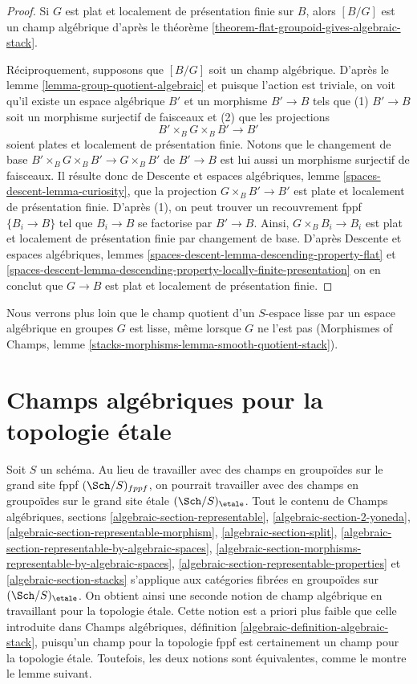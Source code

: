 \begin{proof}
Si $G$ est plat et localement de présentation finie sur $B$, alors
$[B/G]$ est un champ algébrique d'après le
théorème \ref{theorem-flat-groupoid-gives-algebraic-stack}.

\medskip\noindent
Réciproquement, supposons que $[B/G]$ soit un champ algébrique. D'après le
lemme \ref{lemma-group-quotient-algebraic}
et puisque l'action est triviale, on voit
qu'il existe un espace algébrique $B'$ et un morphisme
$B' \to B$ tels que (1) $B' \to B$ soit un morphisme surjectif
de faisceaux et (2) que les projections
$$
B' \times_B G \times_B B' \to B'
$$
soient plates et localement de présentation finie. Notons que le changement de base
$B' \times_B G \times_B B' \to G \times_B B'$ de $B' \to B$
est lui aussi un morphisme surjectif de faisceaux. Il résulte donc de
Descente et espaces algébriques, lemme \ref{spaces-descent-lemma-curiosity},
que la projection $G \times_B B' \to B'$ est plate et localement
de présentation finie. D'après (1), on peut trouver un recouvrement fppf
$\{B_i \to B\}$ tel que $B_i \to B$ se factorise par $B' \to B$.
Ainsi, $G \times_B B_i \to B_i$ est plat et localement de présentation finie
par changement de base. D'après
Descente et espaces algébriques, lemmes
\ref{spaces-descent-lemma-descending-property-flat} et
\ref{spaces-descent-lemma-descending-property-locally-finite-presentation}
on en conclut que $G \to B$ est plat et localement de présentation finie.
\end{proof}

\noindent
Nous verrons plus loin que le champ quotient d'un $S$-espace lisse
par un espace algébrique en groupes $G$ est lisse, même lorsque $G$ ne l'est pas
(Morphismes of Champs, lemme
\ref{stacks-morphisms-lemma-smooth-quotient-stack}).




\section{Champs algébriques pour la topologie étale}
\label{section-stacks-etale}

\noindent
Soit $S$ un schéma. Au lieu de travailler avec des champs en groupoïdes sur
le grand site fppf $(\Sch/S)_{fppf}$, on pourrait travailler avec des champs en groupoïdes
sur le grand site étale $(\Sch/S)_\etale$. Tout le contenu de
Champs algébriques, sections
\ref{algebraic-section-representable},
\ref{algebraic-section-2-yoneda},
\ref{algebraic-section-representable-morphism},
\ref{algebraic-section-split},
\ref{algebraic-section-representable-by-algebraic-spaces},
\ref{algebraic-section-morphisms-representable-by-algebraic-spaces},
\ref{algebraic-section-representable-properties} et
\ref{algebraic-section-stacks}
s'applique aux catégories fibrées en groupoïdes sur $(\Sch/S)_\etale$.
On obtient ainsi une seconde notion de champ algébrique en travaillant pour la
topologie étale. Cette notion est a priori plus faible que celle introduite
dans Champs algébriques, définition \ref{algebraic-definition-algebraic-stack},
puisqu'un champ pour la topologie fppf est certainement un champ pour la topologie
étale. Toutefois, les deux notions sont équivalentes, comme le montre le
lemme suivant.

